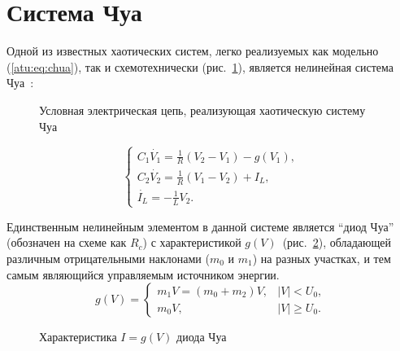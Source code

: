 
\FloatBarrier
\section{Система Чуа} %


Одной из известных хаотических систем, легко реализуемых как модельно (\ref{atu:eq:chua}),
так и схемотехнически (рис.~\ref{atu:f:chuascheme}),
является нелинейная система Чуа~\cite{moon_chaotic_vibr,buga_chua}:

\begin{figure}[htb!]
\begin{center}

\end{center}
\caption{Условная электрическая цепь, реализующая хаотическую систему Чуа}
\label{atu:f:chuascheme}
\end{figure}


\begin{equation}
\begin{cases}
  C_1 \dot{V_1}  = \frac{1}{R} ( V_2 - V_1 ) - g(V_1), \\
  C_2 \dot{V_2}  = \frac{1}{R} ( V_1 - V_2 ) + I_L, \\
  \dot{I_L}      = - \frac{1}{L} V_2 .
\end{cases}
\label{atu:eq:chua}
\end{equation}

Единственным нелинейным элементом в данной системе является ``диод Чуа''
(обозначен на схеме как $R_c$) с
характеристикой $g(V)$~(рис.~\ref{atu:f:diodchua}),
обладающей различным отрицательными наклонами
($m_0$ и $m_1$) на разных участках,
и тем самым являющийся управляемым источником энергии.
%
%
\begin{equation}
g(V) =
\begin{cases}
  m_1 V = ( m_0 + m_2 ) V , & |V| <   U_0, \\
  m_0 V ,                   & |V| \ge U_0.
\end{cases}
\label{atu:eq:diodchua}
\end{equation}

\begin{figure}[htb!]
\begin{center}

\end{center}
\caption{Характеристика \(I=g(V)\) диода Чуа}
\label{atu:f:diodchua}
\end{figure}


